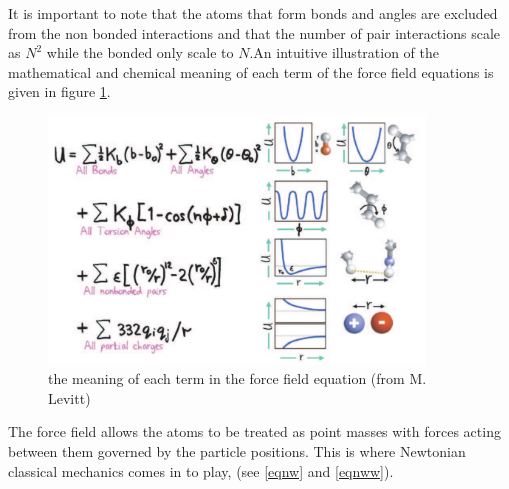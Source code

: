 \documentclass[a4paper,12pt]{article}
\begin{document}
It is important to note that the atoms that form bonds and angles
are excluded from the non bonded interactions and that the number 
of pair interactions scale as
$N^2$ while the bonded only scale to $N$.\newline An intuitive
illustration of the mathematical and chemical meaning of each term
of the force field equations is given in figure \ref {FF}.
\newpage
\begin{figure}[!ht]
\begin{center}
\includegraphics[width=10cm]{ff}
\caption{\label{FF} the meaning of each term in the force field equation (from M. Levitt)}
\end{center}
\end{figure}

The force field allows the atoms to be treated as point masses with forces acting between them governed by the particle positions. This is where Newtonian classical mechanics comes in to play, (see \ref{eqnw} and \ref{eqnww}).
\end{document}

